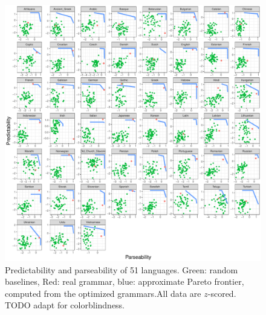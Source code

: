\documentclass[10pt,twoside,lineno]{article}
\begin{document}
\begin{figure}
\centering
\includegraphics[width=\textwidth]{../results/plane/pareto-plane-perLanguage.pdf}
\caption[Predictability and Parseability]{Predictability and parseability of 51 languages. Green: random baselines, Red: real grammar, blue: approximate Pareto frontier, computed from the optimized grammars.\footnotemark All data are $z$-scored. TODO adapt for colorblindness.}\label{fig:pareto-per-lang}
\end{figure}
\end{document}
